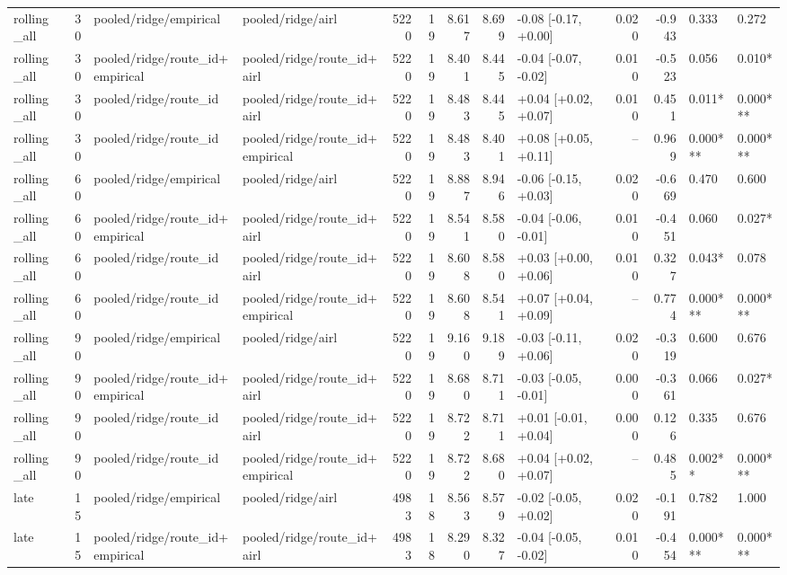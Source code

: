 \begin{tabular}{lrllrrrrlrrll}
rolling_all & 30 & pooled/ridge/empirical & pooled/ridge/airl & 5220 & 19 & 8.617 & 8.699 & -0.08 [-0.17, +0.00] & 0.020 & -0.943 & 0.333 & 0.272 \\
rolling_all & 30 & pooled/ridge/route_id+empirical & pooled/ridge/route_id+airl & 5220 & 19 & 8.401 & 8.445 & -0.04 [-0.07, -0.02] & 0.010 & -0.523 & 0.056 & 0.010* \\
rolling_all & 30 & pooled/ridge/route_id & pooled/ridge/route_id+airl & 5220 & 19 & 8.483 & 8.445 & +0.04 [+0.02, +0.07] & 0.010 & 0.451 & 0.011* & 0.000*** \\
rolling_all & 30 & pooled/ridge/route_id & pooled/ridge/route_id+empirical & 5220 & 19 & 8.483 & 8.401 & +0.08 [+0.05, +0.11] & -- & 0.969 & 0.000*** & 0.000*** \\
rolling_all & 60 & pooled/ridge/empirical & pooled/ridge/airl & 5220 & 19 & 8.887 & 8.946 & -0.06 [-0.15, +0.03] & 0.020 & -0.669 & 0.470 & 0.600 \\
rolling_all & 60 & pooled/ridge/route_id+empirical & pooled/ridge/route_id+airl & 5220 & 19 & 8.541 & 8.580 & -0.04 [-0.06, -0.01] & 0.010 & -0.451 & 0.060 & 0.027* \\
rolling_all & 60 & pooled/ridge/route_id & pooled/ridge/route_id+airl & 5220 & 19 & 8.608 & 8.580 & +0.03 [+0.00, +0.06] & 0.010 & 0.327 & 0.043* & 0.078 \\
rolling_all & 60 & pooled/ridge/route_id & pooled/ridge/route_id+empirical & 5220 & 19 & 8.608 & 8.541 & +0.07 [+0.04, +0.09] & -- & 0.774 & 0.000*** & 0.000*** \\
rolling_all & 90 & pooled/ridge/empirical & pooled/ridge/airl & 5220 & 19 & 9.160 & 9.189 & -0.03 [-0.11, +0.06] & 0.020 & -0.319 & 0.600 & 0.676 \\
rolling_all & 90 & pooled/ridge/route_id+empirical & pooled/ridge/route_id+airl & 5220 & 19 & 8.680 & 8.711 & -0.03 [-0.05, -0.01] & 0.000 & -0.361 & 0.066 & 0.027* \\
rolling_all & 90 & pooled/ridge/route_id & pooled/ridge/route_id+airl & 5220 & 19 & 8.722 & 8.711 & +0.01 [-0.01, +0.04] & 0.000 & 0.126 & 0.335 & 0.676 \\
rolling_all & 90 & pooled/ridge/route_id & pooled/ridge/route_id+empirical & 5220 & 19 & 8.722 & 8.680 & +0.04 [+0.02, +0.07] & -- & 0.485 & 0.002** & 0.000*** \\
late & 15 & pooled/ridge/empirical & pooled/ridge/airl & 4983 & 18 & 8.563 & 8.579 & -0.02 [-0.05, +0.02] & 0.020 & -0.191 & 0.782 & 1.000 \\
late & 15 & pooled/ridge/route_id+empirical & pooled/ridge/route_id+airl & 4983 & 18 & 8.290 & 8.327 & -0.04 [-0.05, -0.02] & 0.010 & -0.454 & 0.000*** & 0.000*** \\

\end{tabular}
